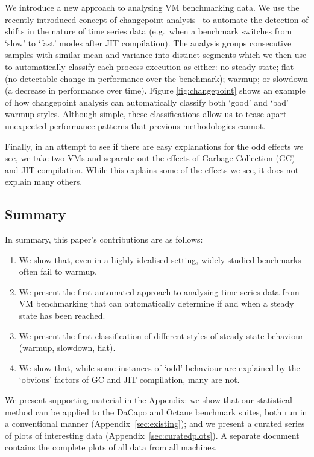 \documentclass[acmlarge]{acmart}\settopmatter{printfolios=true}
\begin{document}
We introduce a new approach to analysing VM benchmarking data. We use the
recently introduced concept of changepoint analysis~\cite{eckley11analysis} to automate the detection
of shifts in the nature of time series data (e.g.~when a benchmark switches
from `slow' to `fast' modes after JIT compilation). The analysis groups consecutive samples
with similar mean and variance into distinct segments
which we then use to automatically classify each process execution as either:
no steady state; flat (no detectable change in performance
over the benchmark); warmup; or slowdown (a decrease in performance over time).
Figure \ref{fig:changepoint} shows an example of how changepoint analysis
can automatically classify both `good' and `bad' warmup styles.
Although simple, these classifications allow us to tease apart
unexpected performance patterns that previous methodologies cannot.

Finally, in an attempt to see if there are easy explanations for the odd
effects we see, we take two VMs and separate out the
effects of Garbage Collection (GC) and JIT compilation. While this explains
some of the effects we see, it does not explain many others.


\subsection{Summary}

In summary, this paper's contributions are as follows:
\begin{enumerate}
    \item We show that, even in a highly idealised setting, widely studied benchmarks
often fail to warmup.
    \item We present the first automated approach to analysing time series
data from VM benchmarking that can automatically determine if and when a steady
state has been reached.
    \item We present the first classification of different styles of
steady state behaviour (warmup, slowdown, flat).
    \item We show that, while some instances of `odd' behaviour are explained by
the `obvious' factors of GC and JIT compilation, many are not.
\end{enumerate}

We present supporting material in the Appendix: we show that our
statistical method can be applied to the DaCapo and Octane benchmark suites,
both run in a conventional manner (Appendix~\ref{sec:existing}); and we present a curated
series of plots of interesting data (Appendix~\ref{sec:curatedplots}). A
separate document contains the complete plots of all data from all machines.
\end{document}
